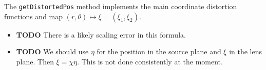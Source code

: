 \documentclass{scrartcl}
\begin{document}
The \texttt{getDistortedPos} method implements the main coordinate distortion
functions and map $(r, \theta) \mapsto \xi = (\xi_1,\xi_2)$.

\begin{itemize}
   \item \textbf{TODO} There is a likely scaling error in this formula.
   \item \textbf{TODO} We should use $\eta$ for the position in the source plane and
        $\xi$ in the lens plane.  Then $\xi=\chi\eta$.
        This is not done consistently at the moment.
\end{itemize}
\end{document}
